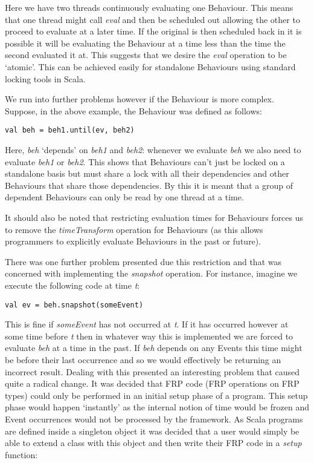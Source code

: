       Here we have two threads continuously evaluating one Behaviour. This means that one thread
      might call \emph{eval} and then be scheduled out allowing the other to proceed to evaluate
      at a later time. If the original is then scheduled back in it is possible it will
      be evaluating the Behaviour at a time less than the time the second evaluated it at. This suggests
      that we desire the \emph{eval} operation to be `atomic'. This can be achieved easily for standalone
      Behaviours using standard locking tools in Scala.
      
      We run into further problems however if the Behaviour is more complex. Suppose, in the above example,
      the Behaviour was defined as follows:

\begin{verbatim}
val beh = beh1.until(ev, beh2)
\end{verbatim}        

      Here, \emph{beh} `depends' on \emph{beh1} and \emph{beh2}: whenever we evaluate \emph{beh}
      we also need to evaluate \emph{beh1} or \emph{beh2}. This shows that Behaviours can't just
      be locked on a standalone basis but must share a lock with all their dependencies and other Behaviours
      that share those dependencies. By this it is meant that a group of dependent Behaviours can
      only be read by one thread at a time.
      
      It should also be noted that restricting evaluation times for Behaviours forces us
      to remove the \emph{timeTransform} operation for Behaviours (as this allows programmers to explicitly
      evaluate Behaviours in the past or future).
      
      There was one further problem presented due this restriction and that was concerned with
      implementing the \emph{snapshot} operation. For instance, imagine we execute the following code
      at time \emph{t}:
      
\begin{verbatim}
val ev = beh.snapshot(someEvent)
\end{verbatim}

      This is fine if \emph{someEvent} has not occurred at \emph{t}. If it has occurred however at some time
      before \emph{t} then in whatever way this is implemented we are forced to evaluate \emph{beh}
      at a time in the past. If \emph{beh} depends on any Events this time might be before their
      last occurrence and so we would effectively be returning an incorrect result. Dealing with this
      presented an interesting problem that caused quite a radical change. It was decided that FRP
      code (FRP operations on FRP types) could only be performed in an initial setup phase of a program.
      This setup phase would happen `instantly' as the internal notion of time would be frozen and Event
      occurrences would not be processed by the framework. As Scala programs are defined inside a singleton
      object it was decided that a user would simply be able to extend a class with this object and then
      write their FRP code in a \emph{setup} function:
 
